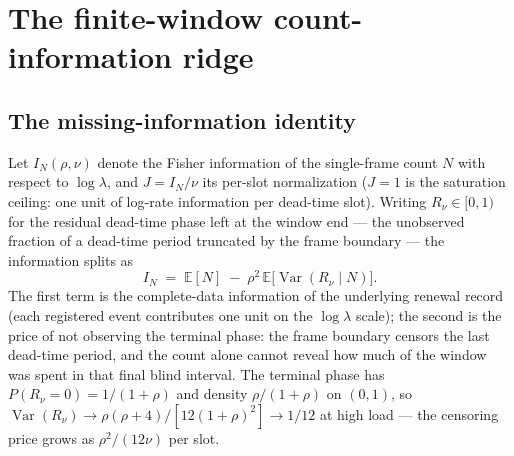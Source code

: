 \documentclass[10pt,twocolumn]{article}
\begin{document}
\section{The finite-window count-information ridge}
\label{sec:ridge}
\subsection{The missing-information identity}
Let $I_N(\rho,\nu)$ denote the Fisher information of the single-frame count
$N$ with respect to $\log\lambda$, and $J = I_N/\nu$ its per-slot
normalization ($J = 1$ is the saturation ceiling: one unit of log-rate
information per dead-time slot). Writing $R_\nu \in [0,1)$ for the residual
dead-time phase left at the window end — the unobserved fraction of a
dead-time period truncated by the frame boundary — the information splits as
\begin{equation}
  I_N \;=\; \mathbb{E}[N] \;-\; \rho^{2}\,
  \mathbb{E}\bigl[\operatorname{Var}(R_\nu \mid N)\bigr].
  \label{eq:missing}
\end{equation}
The first term is the complete-data information of the underlying renewal
record (each registered event contributes one unit on the $\log\lambda$
scale); the second is the price of not observing the terminal phase: the
frame boundary censors the last dead-time period, and the count alone cannot
reveal how much of the window was spent in that final blind interval. The
terminal phase has $P(R_\nu = 0) = 1/(1+\rho)$ and density $\rho/(1+\rho)$
on $(0,1)$, so $\operatorname{Var}(R_\nu) \to \rho(\rho+4)/[12(1+\rho)^2]
\to 1/12$ at high load — the censoring price grows as $\rho^{2}/(12\nu)$
per slot.
\end{document}
